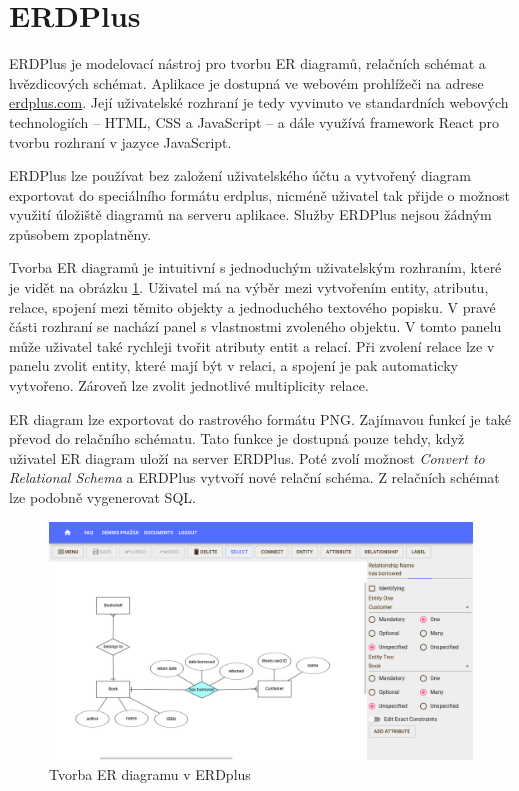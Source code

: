 \section{ERDPlus}

ERDPlus je modelovací nástroj pro tvorbu ER diagramů, relačních schémat a
hvězdicových schémat. Aplikace je dostupná ve webovém prohlížeči na adrese
\url{erdplus.com}. Její uživatelské rozhraní je tedy vyvinuto ve standardních
webových technologiích -- HTML, CSS a JavaScript -- a dále využívá framework
React pro tvorbu rozhraní v jazyce JavaScript.

ERDPlus lze používat bez založení uživatelského účtu a vytvořený diagram
exportovat do speciálního formátu erdplus, nicméně uživatel tak přijde o možnost
využití úložiště diagramů na serveru aplikace. Služby ERDPlus nejsou žádným
způsobem zpoplatněny.

Tvorba ER diagramů je intuitivní s jednoduchým uživatelským rozhraním, které je
vidět na obrázku \ref{fig:erdplus}. Uživatel má na výběr mezi vytvořením entity,
atributu, relace, spojení mezi těmito objekty a jednoduchého textového popisku.
V pravé části rozhraní se nachází panel s vlastnostmi zvoleného objektu. V tomto
panelu může uživatel také rychleji tvořit atributy entit a relací. Při zvolení
relace lze v panelu zvolit entity, které mají být v relaci, a spojení je pak
automaticky vytvořeno. Zároveň lze zvolit jednotlivé multiplicity relace.

ER diagram lze exportovat do rastrového formátu PNG. Zajímavou funkcí je také
převod do relačního schématu. Tato funkce je dostupná pouze tehdy, když uživatel
ER diagram uloží na server ERDPlus. Poté zvolí možnost \emph{Convert to
Relational Schema} a ERDPlus vytvoří nové relační schéma. Z relačních schémat
lze podobně vygenerovat SQL.

\begin{figure}
  \centering
  \includegraphics[width=\textwidth]{../img/erdplus.png}
  \caption{Tvorba ER diagramu v ERDplus}
  \label{fig:erdplus}
\end{figure}

